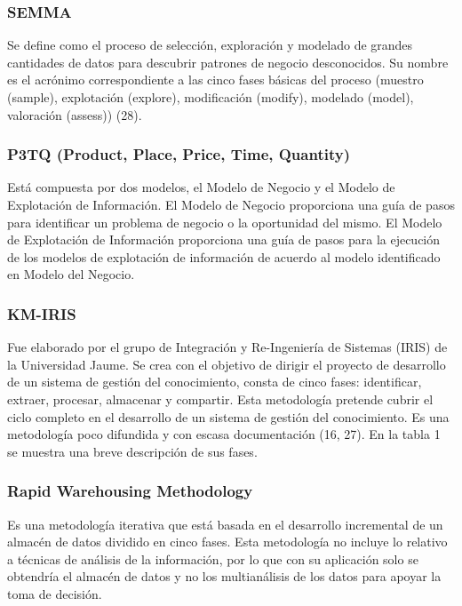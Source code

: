 \documentclass[twoside,twocolumn]{article}
\begin{document}
\subsubsection{SEMMA}
Se define como el proceso de selección, exploración y modelado de grandes cantidades de datos para descubrir patrones de negocio desconocidos. Su nombre es el acrónimo correspondiente a las cinco fases básicas del proceso (muestro (sample), explotación (explore), modificación (modify), modelado (model), valoración (assess)) (28).  
\subsubsection{P3TQ (Product, Place, Price, Time, Quantity) }
Está compuesta por dos modelos, el Modelo de Negocio y el Modelo de Explotación de Información. El Modelo de Negocio proporciona una guía de pasos para identificar un problema de negocio o la oportunidad del mismo. El Modelo de Explotación de Información proporciona una guía de pasos para la ejecución de los modelos de explotación de información de acuerdo al modelo identificado en Modelo del Negocio.  
\subsubsection{KM-IRIS}
Fue elaborado por el grupo de Integración y Re-Ingeniería de Sistemas (IRIS) de la Universidad Jaume. Se crea con el objetivo de dirigir el proyecto de desarrollo de un sistema de gestión del conocimiento, consta de cinco fases: identificar, extraer, procesar, almacenar y compartir. Esta metodología pretende cubrir el ciclo completo en el desarrollo de un sistema de gestión del conocimiento. Es una metodología poco difundida y con escasa documentación (16, 27). En la tabla 1 se muestra una breve descripción de sus fases.
\subsubsection{Rapid Warehousing Methodology}
Es una metodología iterativa que está basada en el desarrollo incremental de un almacén de datos dividido en cinco fases. Esta metodología no incluye lo relativo a técnicas de análisis de la información, por lo que con su aplicación solo se obtendría el almacén de datos y no los multianálisis de los datos para apoyar la toma de decisión. 
\end{document}
